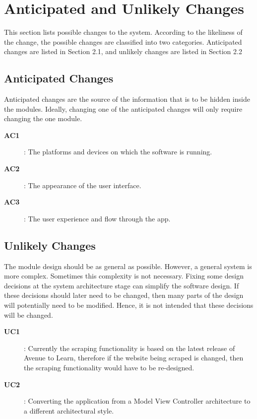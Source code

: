 \documentclass[12pt, titlepage]{article}
\begin{document}
\section{Anticipated and Unlikely Changes}
This section lists possible changes to the system. According to the likeliness of the change, the possible changes are classified into two categories. Anticipated changes are listed in Section 2.1, and unlikely changes are listed in Section 2.2

\subsection{Anticipated Changes}
Anticipated changes are the source of the information that is to be hidden inside the modules. Ideally, changing one of the anticipated changes will only require changing the one module.\\

\begin{description}
    \item[\textbf{AC1}]: The platforms and devices on which the software is running.
    \item[\textbf{AC2}]: The appearance of the user interface.
    \item[\textbf{AC3}]: The user experience and flow through the app.
\end{description}

\subsection{Unlikely Changes}
The module design should be as general as possible. However, a general system is more complex. Sometimes this complexity is not necessary. Fixing some design decisions at the system architecture stage can simplify the software design. If these decisions should later need to be changed, then many parts of the design will potentially need to be modified. Hence, it is not intended that these decisions will be changed.\\

\begin{description}
    \item[\textbf{UC1}]: Currently the scraping functionality is based on the latest release of Avenue to Learn, therefore if the website being scraped is changed, then the scraping functionality would have to be re-designed.
    \item[\textbf{UC2}]: Converting the application from a Model View Controller architecture to a different architectural style.
\end{description}
\end{document}
